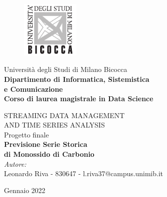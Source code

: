 
\begin{titlepage}
\begin{onehalfspace}
	\begin{figure}
		\vspace*{-7mm}
		\centering
		\includegraphics[width=0.25\textwidth]{Pictures/logo_unimib.pdf}
	\end{figure}
	\par
	\noindent Università degli Studi di Milano Bicocca \\
	\textbf{Dipartimento di Informatica, Sistemistica \\ e Comunicazione \\
			Corso di laurea magistrale in Data Science}
\end{onehalfspace}


\vfill
\par


\begin{doublespace}
\begin{center}
	{\Large STREAMING DATA MANAGEMENT \\ AND TIME SERIES ANALYSIS} \\
	{\Large Progetto finale} \\
	\vspace{1.5cm}
	{\LARGE \textbf{Previsione Serie Storica \\ di Monossido di Carbonio}} \\
	\vspace{1.5cm}
	{\large \textit{Autore:}} \\
	{\large Leonardo Riva - 830647 - l.riva37@campus.unimib.it} \\
\end{center}
\end{doublespace}


\vfill
\par

\centering \large Gennaio 2022


\end{titlepage}